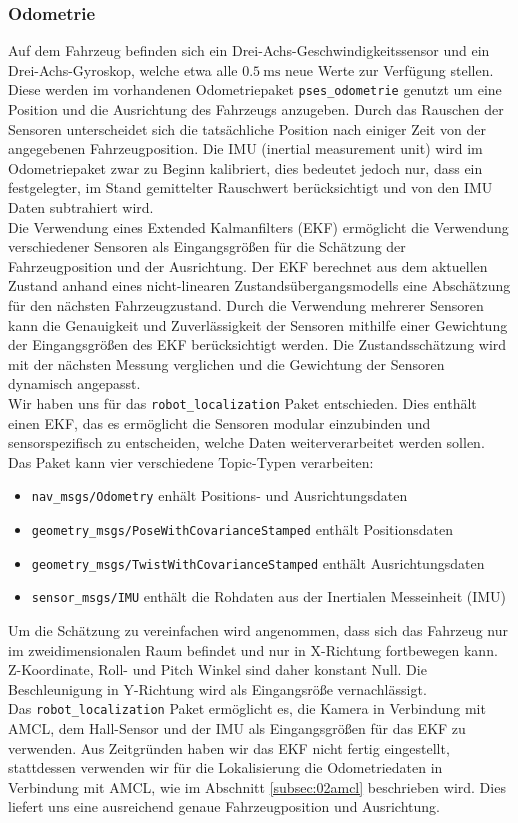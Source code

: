 \subsubsection{Odometrie}
\label{subsec:02odom}
Auf dem Fahrzeug befinden sich ein Drei-Achs-Geschwindigkeitssensor und ein Drei-Achs-Gyroskop, welche etwa alle $\SI{0.5}{\milli\second}$ neue Werte zur Verf\"ugung stellen. Diese werden im vorhandenen Odometriepaket \texttt{pses\_odometrie} genutzt um eine Position und die Ausrichtung des Fahrzeugs anzugeben. Durch das Rauschen der Sensoren unterscheidet sich die tats\"achliche Position  nach einiger Zeit von der angegebenen Fahrzeugposition. Die IMU (inertial measurement unit) wird im Odometriepaket zwar zu Beginn kalibriert, dies bedeutet jedoch nur, dass ein festgelegter, im Stand gemittelter Rauschwert ber\"ucksichtigt und von den IMU Daten subtrahiert wird.\\
Die Verwendung eines Extended Kalmanfilters (EKF) erm\"oglicht die Verwendung verschiedener Sensoren als Eingangsgr\"o{\ss}en f\"ur die Sch\"atzung der Fahrzeugposition und der Ausrichtung. Der EKF berechnet aus dem aktuellen Zustand anhand eines nicht-linearen Zustands\"ubergangsmodells eine Absch\"atzung f\"ur den n\"achsten Fahrzeugzustand. Durch die Verwendung mehrerer Sensoren kann die Genauigkeit und Zuverl\"assigkeit der Sensoren mithilfe einer Gewichtung der Eingangsgr\"o{\ss}en des EKF ber\"ucksichtigt werden.  Die Zustandssch\"atzung wird mit der n\"achsten Messung verglichen und die Gewichtung der Sensoren dynamisch angepasst.\\
Wir haben uns f\"ur das \texttt{robot\_localization} Paket entschieden. Dies enth\"alt einen EKF, das es erm\"oglicht die Sensoren modular einzubinden und sensorspezifisch zu entscheiden, welche Daten weiterverarbeitet werden sollen.
Das Paket kann vier verschiedene Topic-Typen verarbeiten:
\begin{itemize}
	\item \texttt{nav\_msgs/Odometry} enh\"alt Positions- und Ausrichtungsdaten
	\item \texttt{geometry\_msgs/PoseWithCovarianceStamped} enth\"alt Positionsdaten
	\item \texttt{geometry\_msgs/TwistWithCovarianceStamped} enth\"alt Ausrichtungsdaten
	\item \texttt{sensor\_msgs/IMU} enth\"alt die Rohdaten aus der Inertialen Messeinheit (IMU)
\end{itemize}
Um die Sch\"atzung zu vereinfachen wird angenommen, dass sich das Fahrzeug nur im zweidimensionalen Raum befindet und nur in X-Richtung fortbewegen kann. Z-Koordinate, Roll- und Pitch Winkel sind daher konstant Null. Die Beschleunigung in Y-Richtung wird als Eingangsr\"o{\ss}e vernachl\"assigt. \\
Das \texttt{robot\_localization} Paket erm\"oglicht es, die Kamera in Verbindung mit  AMCL, dem Hall-Sensor und der IMU als Eingangsgr\"o{\ss}en f\"ur das EKF zu verwenden. Aus Zeitgr\"unden haben wir das EKF nicht fertig eingestellt, stattdessen verwenden wir f\"ur die Lokalisierung die Odometriedaten in Verbindung mit AMCL, wie im Abschnitt \ref{subsec:02amcl} beschrieben wird. Dies liefert uns eine ausreichend genaue Fahrzeugposition und Ausrichtung.
